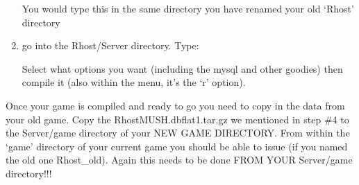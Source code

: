 \documentclass[letterpaper,10pt,english]{sphinxmanual}
\begin{document}
\begin{enumerate}
\sphinxAtStartPar
You would type this in the same directory you have renamed your old ‘Rhost’ directory

\item {} 
\sphinxAtStartPar
go into the Rhost/Server directory.   Type:

\begin{sphinxVerbatim}[commandchars=\\\{\}]
 
\end{sphinxVerbatim}

\sphinxAtStartPar
Select what options you want (including the mysql and other goodies) then compile it (also within the menu, it’s the ‘r’ option).

\end{enumerate}

   Once your game is compiled and ready to go you need to copy in the data from your old game.  Copy the RhostMUSH.dbflat1.tar.gz we mentioned in step \#4 to the Server/game directory of your NEW GAME DIRECTORY.  From within the ‘game’ directory of your current game you should be able to issue (if you named the old one Rhost\_old). Again this needs to be done FROM YOUR Server/game directory!!!
\end{document}
